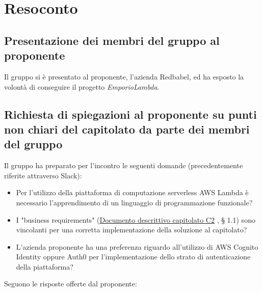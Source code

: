 \section{Resoconto}
\subsection{Presentazione dei membri del gruppo al proponente}
Il gruppo si è presentato al proponente, l'azienda Redbabel, ed ha esposto la volontà di conseguire il progetto \textit{EmporioLambda}.
\subsection{Richiesta di spiegazioni al proponente su punti non chiari del capitolato da parte dei membri del gruppo}
Il gruppo ha preparato per l'incontro le seguenti domande (precedentemente riferite attraverso Slack):
\begin{itemize}
\item Per l'utilizzo della piattaforma di computazione serverless AWS Lambda è necessario l'apprendimento di un linguaggio di programmazione funzionale?
\item I "business requirements" (\href{https://www.math.unipd.it/~tullio/IS-1/2020/Progetto/C2.pdf}{Documento descrittivo capitolato C2} , § 1.1) sono vincolanti per una corretta implementazione della soluzione al capitolato?
\item L'azienda proponente ha una preferenza riguardo all'utilizzo di AWS Cognito Identity oppure Auth0 per l'implementazione dello strato di autenticazione della piattaforma?
\end{itemize}
Seguono le risposte offerte dal proponente:
